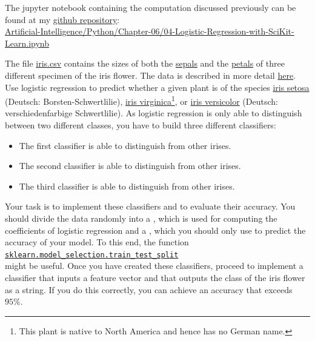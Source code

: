 The jupyter notebook containing the computation discussed previously can be found at my \href{https://github.com/karlstroetmann/Artificial-Intelligence}{github repository}:
\\[0.2cm]
\hspace*{0.3cm}
\href{https://github.com/karlstroetmann/Artificial-Intelligence/blob/master/Python/Chapter-06/04-Logistic-Regression-with-SciKit-Learn.ipynb}
{Artificial-Intelligence/Python/Chapter-06/04-Logistic-Regression-with-SciKit-Learn.ipynb}

\exercise 
The file \href{https://github.com/karlstroetmann/Artificial-Intelligence/blob/master/Python/iris.csv}{iris.csv}
contains the sizes of both the \href{https://en.wikipedia.org/wiki/Sepal}{sepals} and the
\href{https://en.wikipedia.org/wiki/Pepal}{petals} of three different specimen of the iris flower.  The
data is described in more detail \href{https://en.wikipedia.org/wiki/Iris_flower_data_set}{here}. 
Use logistic regression to predict whether a given plant is of the species
\href{https://en.wikipedia.org/wiki/Iris_setosa}{iris setosa} (Deutsch: Borsten-Schwertlilie),
\href{https://en.wikipedia.org/wiki/Iris_virginica}{iris virginica}\footnote{
This plant is native to North America and hence has no German name.}, or
\href{https://en.wikipedia.org/wiki/Iris_versicolor}{iris versicolor} (Deutsch: verschiedenfarbige Schwertlilie).
As logistic regression is only able to distinguish between two different classes, you
have to build three different classifiers:
\begin{itemize}
\item The first classifier is able to distinguish  from other irises. 
\item The second classifier is able to distinguish  from other irises. 
\item The third classifier is able to distinguish  from other irises. 
\end{itemize}
Your task is to implement these classifiers and to evaluate their accuracy.  
You should divide the data randomly into a , which is used for computing the
coefficients of logistic regression and a , which you should only use to predict the
accuracy of your model.  To this end, the function
\\[0.2cm]
\hspace*{1.3cm}
\href{https://scikit-learn.org/stable/modules/generated/sklearn.model_selection.train_test_split.html}{\texttt{sklearn.model\_selection.train\_test\_split}}
\\[0.2cm]
might be useful.  Once you have created these classifiers, proceed to implement a classifier that inputs a
feature vector and that outputs the class of the iris flower as a string.  If you do this correctly, you can
achieve an accuracy that exceeds $95\%$.

